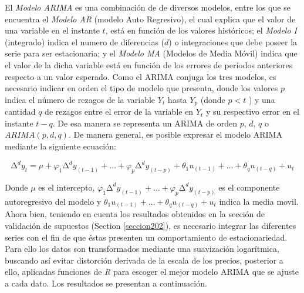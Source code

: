\documentclass[11pt]{article}
\begin{document}
    El \emph{Modelo ARIMA} es una combinación de de diversos modelos, entre
los que se encuentra el \emph{Modelo AR} (modelo Auto Regresivo), el
cual explica que el valor de una variable en el instante \(t\), está en
función de los valores históricos; el \emph{Modelo I} (integrado) indica
el numero de diferencias (\(d\)) o integraciones que debe poseer la
serie para ser estacionaria; y el \emph{Modelo MA} (Modelos de Media
Móvil) indica que el valor de la dicha variable está en función de los
errores de períodos anteriores respecto a un valor esperado. Como el
ARIMA conjuga los tres modelos, es necesario indicar en orden el tipo de
modelo que presenta, donde los valores \(p\) indica el número de rezagos
de la variable \(Y_t\) hasta \(Y_p\) (donde \(p<t\) ) y una cantidad
\(q\) de rezagos entre el error de la variable en \(Y_t\) y su
respectivo error en el instante \(t-q\). De esa manera se representa un
ARIMA de orden \(p\), \(d\), \(q\) o \(ARIMA(p, d, q)\). De manera
general, es posible expresar el modelo ARIMA mediante la siguiente
ecuación:

\begin{equation*}
∆^d y_t= μ+ φ_1 ∆^d y_{(t-1)} +…+ φ_p ∆^d y_{(t-p)}+θ_1u_{(t-1)}+…+ θ_q u_{(t-q)}+u_t
\end{equation*}

Donde \(μ\) es el intercepto,
\(φ_1 ∆^d y_{(t-1)} +…+ φ_p ∆^d y_{(t-p)}\) es el componente
autoregresivo del modelo y \(θ_1u_{(t-1)}+…+ θ_q u_{(t-q)}+u_t\) indica
la media movil. Ahora bien, teniendo en cuenta los resultados obtenidos
en la sección de validación de supuestos (Section \ref{seccion202}), es
necesario integrar las diferentes series con el fin de que éstas
presenten un comportamiento de estacionariedad. Para ello los datos son
transformados mediante una suavización logarítmica, buscando así evitar
distorción derivada de la escala de los precios, posterior a ello,
aplicadas funciones de \emph{R} para escoger el mejor modelo ARIMA que
se ajuste a cada dato. Los resultados se presentan a continuación.
\end{document}
